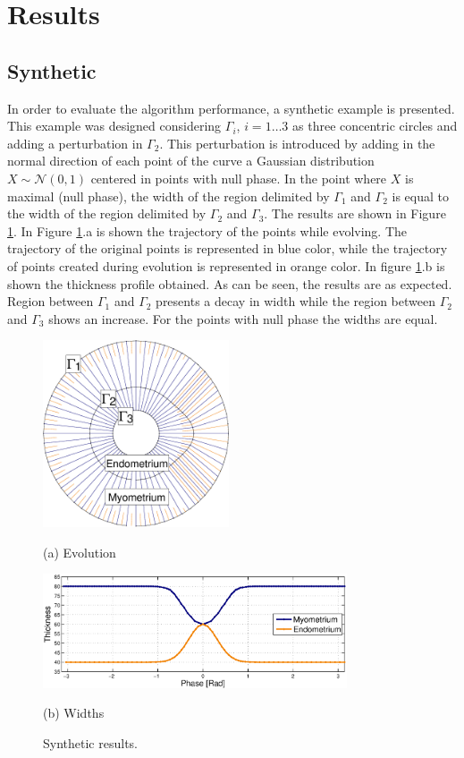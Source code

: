 \documentclass{article}
\begin{document}
\section{Results}
\label{sec:results}

\subsection{Synthetic}
\label{ssec:syn}
In order to evaluate the algorithm performance, a synthetic example is presented. This example was designed considering $\Gamma_i$, $i=1\dots3$ as three concentric circles and adding a perturbation in $\Gamma_2$. This perturbation is introduced by adding in the normal direction of each point of the curve a Gaussian distribution $X \sim \mathcal{N}(0,1)$ centered in points with null phase. In the point where $X$ is maximal (null phase), the width of the region delimited by $\Gamma_1$ and $\Gamma_2$ is equal to the width of the region delimited by $\Gamma_2$ and $\Gamma_3$. The results are shown in Figure \ref{fig:synth}. In Figure \ref{fig:synth}.a is shown the trajectory of the points while evolving. The trajectory of the original points is represented in blue color, while the trajectory of points created during evolution is represented in orange color. In figure \ref{fig:synth}.b is shown the thickness profile obtained. As can be seen, the results are as expected. Region between $\Gamma_1$ and $\Gamma_2$ presents a decay in width while the region between $\Gamma_2$ and $\Gamma_3$ shows an increase. For the points with null phase the widths are equal.
\begin{figure}[t]
  \begin{minipage}[b]{1\linewidth}
    \centering
    \centerline{\includegraphics[width=5.5cm]{pics/synth}}
    \centerline{(a) Evolution}\medskip
  \end{minipage}
  \begin{minipage}[b]{1\linewidth}
    \centering
    \centerline{\includegraphics[width=9cm]{pics/synthWidth}}
    \centerline{(b) Widths}\medskip
  \end{minipage}
  \caption{Synthetic results.}
  \label{fig:synth}
\end{figure}
\end{document}
